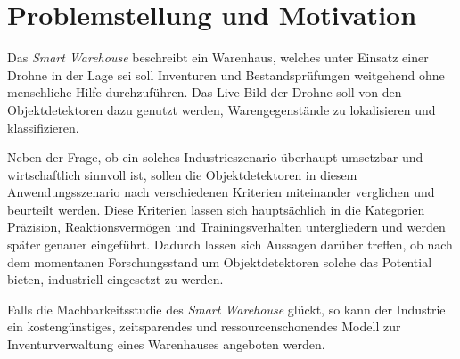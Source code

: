 \section{Problemstellung und Motivation}

Das \textit{Smart Warehouse} beschreibt ein Warenhaus, welches unter Einsatz einer Drohne in der Lage sei soll Inventuren und Bestandsprüfungen weitgehend ohne menschliche Hilfe durchzuführen. Das Live-Bild der Drohne soll von den Objektdetektoren dazu genutzt werden, Warengegenstände zu lokalisieren und klassifizieren. 

\newpage

Neben der Frage, ob ein solches Industrieszenario überhaupt umsetzbar und wirtschaftlich sinnvoll ist, sollen die Objektdetektoren in diesem Anwendungsszenario nach verschiedenen Kriterien miteinander verglichen und beurteilt werden. Diese Kriterien lassen sich hauptsächlich in die Kategorien Präzision, Reaktionsvermögen und Trainingsverhalten untergliedern und werden später genauer eingeführt. Dadurch lassen sich Aussagen darüber treffen, ob nach dem momentanen Forschungsstand um Objektdetektoren solche das Potential bieten, industriell eingesetzt zu werden. 

Falls die Machbarkeitsstudie des \textit{Smart Warehouse} glückt, so kann der Industrie ein kostengünstiges, zeitsparendes und ressourcenschonendes Modell zur Inventurverwaltung eines Warenhauses angeboten werden.